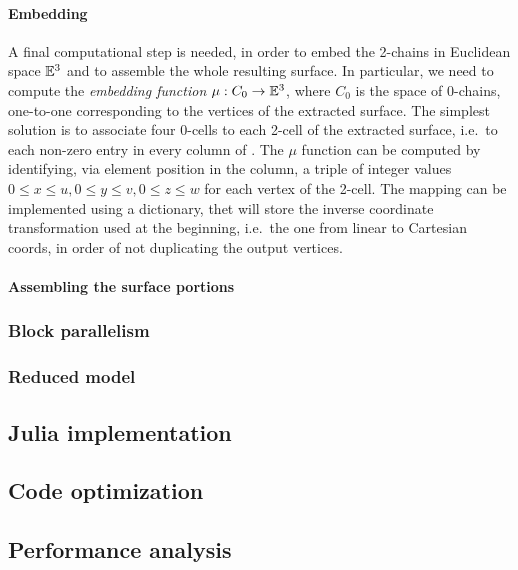 \paragraph{Embedding}
A final computational step is needed, in order to embed the 2-chains in Euclidean space $\mathbb{E}^3$ and to assemble the whole resulting surface. In particular, we need to compute the \emph{embedding function} $\mu : C_0 \to \mathbb{E}^3$, where $C_0$ is the space of 0-chains, one-to-one corresponding to the vertices of the extracted surface. The simplest solution is to associate  four 0-cells to each 2-cell of the extracted surface, i.e.~to each non-zero entry in every column of .  The $\mu$ function  can be computed by identifying, via  element position in the column, a triple of integer values $0\leq x\leq u, 0\leq y\leq v, 0\leq z\leq w$ for each vertex of the 2-cell.  The mapping can be implemented using a dictionary, thet will store the inverse coordinate transformation used at the beginning, i.e.~the one from linear to Cartesian coords, in order of not duplicating the output vertices.  

\paragraph{Assembling the surface portions}


\subsubsection{Block parallelism}\label{sec:bbbb}

\subsubsection{Reduced model}\label{sec:bbbb}







\subsection{Julia implementation}\label{sec:implementation}


\subsection{Code optimization}\label{sec:optimization}


\subsection{Performance analysis}\label{sec:analysis}

